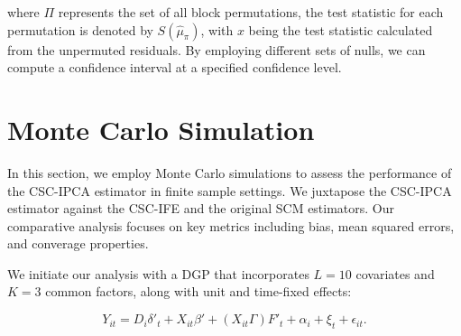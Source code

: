 \documentclass[12pt]{article}
\begin{document}
\noindent where $\Pi$ represents the set of all block permutations, the test statistic for each permutation is denoted by $S(\hat{\mu}_{\pi})$, with $x$ being the test statistic calculated from the unpermuted residuals. By employing different sets of nulls, we can compute a confidence interval at a specified confidence level.

\section{Monte Carlo Simulation} 
\label{sec: simulation}
In this section, we employ Monte Carlo simulations to assess the performance of the CSC-IPCA estimator in finite sample settings. We juxtapose the CSC-IPCA estimator against the CSC-IFE and the original SCM estimators. Our comparative analysis focuses on key metrics including bias, mean squared errors, and converage properties. 

We initiate our analysis with a DGP that incorporates $L=10$ covariates and $K=3$ common factors, along with unit and time-fixed effects:

\begin{equation}
Y_{it} = D_{i} \delta'_{t} + X_{it}\beta' + (X_{it}\Gamma) F'_{t} + \alpha_i + \xi_t + \epsilon_{it}.
\label{eq: dgp}
\end{equation}
\end{document}
